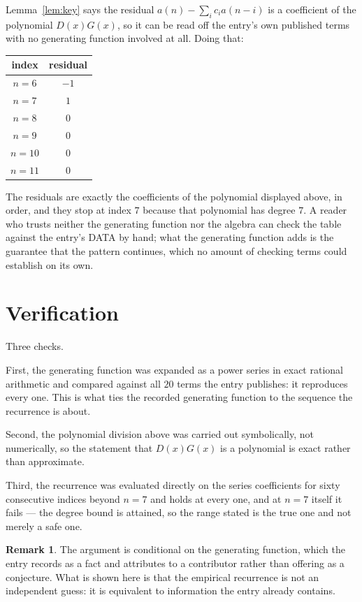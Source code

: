\documentclass[11pt,a4paper]{article}
\theoremstyle{plain}
\theoremstyle{definition}
\newtheorem{remark}[theorem]{Remark}
\begin{document}
Lemma~\ref{lem:key} says the residual $a(n)-\sum_ic_ia(n-i)$ is a coefficient of the
polynomial $D(x)G(x)$, so it can be read off the entry's own published terms with no
generating function involved at all. Doing that:
\begin{center}
\begin{tabular}{cc}
index & residual \\ \hline
$n=6$ & $-1$ \\
$n=7$ & $1$ \\
$n=8$ & $0$ \\
$n=9$ & $0$ \\
$n=10$ & $0$ \\
$n=11$ & $0$
\end{tabular}
\end{center}
The residuals are exactly the coefficients of the polynomial displayed above, in order, and
they stop at index $7$ because that polynomial has degree $7$. A reader who trusts
neither the generating function nor the algebra can check the table against the entry's DATA
by hand; what the generating function adds is the guarantee that the pattern continues, which
no amount of checking terms could establish on its own.

\section{Verification}

Three checks.

First, the generating function was expanded as a power series in exact rational arithmetic and
compared against all $20$ terms the entry publishes: it reproduces every one. This is
what ties the recorded generating function to the sequence the recurrence is about.

Second, the polynomial division above was carried out symbolically, not numerically, so the
statement that $D(x)G(x)$ is a polynomial is exact rather than approximate.

Third, the recurrence was evaluated directly on the series coefficients for sixty consecutive
indices beyond $n=7$ and holds at every one, and at $n=7$ itself it fails --- the
degree bound is attained, so the range stated is the true one and not merely a safe one.

\begin{remark}
The argument is conditional on the generating function, which the entry records as a fact and
attributes to a contributor rather than offering as a conjecture. What is shown here is that
the empirical recurrence is not an independent guess: it is equivalent to information the
entry already contains.
\end{remark}
\end{document}
